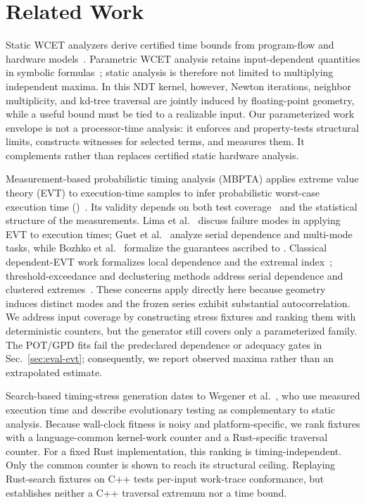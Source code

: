 \section{Related Work}
\label{sec:related}

Static WCET analyzers derive certified time bounds from program-flow and hardware
models~\cite{ferdinand2001ait,wilhelm2008wcet}. Parametric WCET analysis retains
input-dependent quantities in symbolic formulas~\cite{bygde2008parametric,huber2012parametric};
static analysis is therefore not limited to multiplying independent maxima. In this NDT
kernel, however, Newton iterations, neighbor multiplicity, and kd-tree traversal are jointly
induced by floating-point geometry, while a useful bound must be tied to a realizable input.
Our parameterized work envelope is not a processor-time analysis: it enforces and
property-tests structural limits, constructs witnesses for selected terms, and measures them.
It complements rather than replaces certified static hardware analysis.

Measurement-based probabilistic timing analysis (MBPTA) applies extreme value theory (EVT)
to execution-time samples to infer probabilistic worst-case execution time
(\pwcet{})~\cite{edgar2001gumbel,cucu2012mbpta,cazorla2019mbpta}. Its validity depends on both
test coverage~\cite{law2016coverage} and the statistical structure of the measurements.
Lima et al.~\cite{lima2016careful} discuss failure modes in applying EVT to execution times;
Guet et al.~\cite{guet2017representativity} analyze serial dependence and multi-mode tasks,
while Bozhko et al.~\cite{bozhko2023pwcet} formalize the guarantees ascribed to \pwcet{}.
Classical dependent-EVT work formalizes local dependence and the extremal
index~\cite{leadbetter1983extremes}; threshold-exceedance and declustering methods address
serial dependence and clustered extremes~\cite{davison1990threshold,ferro2003clusters}.
These concerns apply directly here because geometry induces distinct modes and the frozen
series exhibit substantial autocorrelation. We address input coverage by constructing stress
fixtures and ranking them with deterministic counters, but the generator still covers only a
parameterized family. The POT/GPD fits fail the predeclared dependence or adequacy gates in
Sec.~\ref{sec:eval-evt}; consequently, we report observed maxima rather than an extrapolated
\pwcet{} estimate.

Search-based timing-stress generation dates to Wegener et
al.~\cite{wegener1997testing,wegener2001comparison}, who use measured execution time and
describe evolutionary testing as complementary to static analysis. Because wall-clock
fitness is noisy and platform-specific, we rank fixtures with a language-common kernel-work
counter and a Rust-specific traversal counter. For a fixed Rust implementation, this ranking
is timing-independent. Only the common counter is shown to reach its structural ceiling.
Replaying Rust-search fixtures on C++ tests per-input work-trace conformance, but establishes
neither a C++ traversal extremum nor a time bound.

